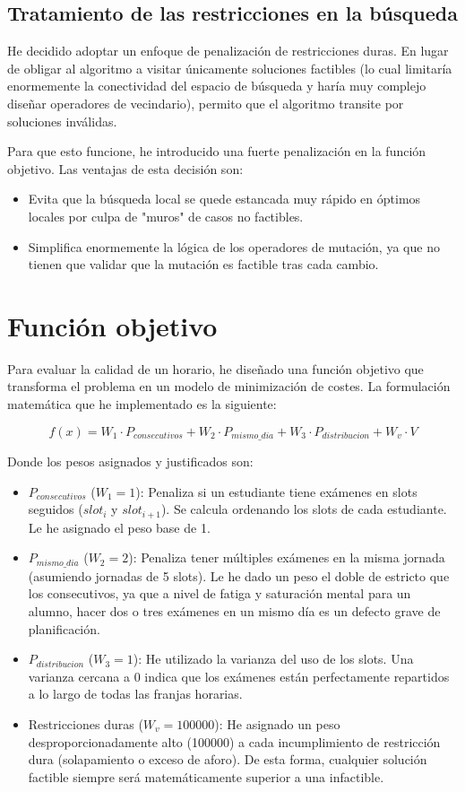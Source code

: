 \documentclass[12pt]{article}
\begin{document}
\subsection{Tratamiento de las restricciones en la búsqueda}
He decidido adoptar un enfoque de penalización de restricciones duras. En lugar de obligar al algoritmo a visitar únicamente soluciones factibles (lo cual limitaría enormemente la conectividad del espacio de búsqueda y haría muy complejo diseñar operadores de vecindario), permito que el algoritmo transite por soluciones inválidas.

Para que esto funcione, he introducido una fuerte penalización en la función objetivo. Las ventajas de esta decisión son:
\begin{itemize}
    \item Evita que la búsqueda local se quede estancada muy rápido en óptimos locales por culpa de "muros" de casos no factibles.
    \item Simplifica enormemente la lógica de los operadores de mutación, ya que no tienen que validar que la mutación es factible tras cada cambio.
\end{itemize}

\section{Función objetivo}
Para evaluar la calidad de un horario, he diseñado una función objetivo que transforma el problema en un modelo de minimización de costes. La formulación matemática que he implementado es la siguiente: 

$$f(x) = W_1 \cdot P_{consecutivos} + W_2 \cdot P_{mismo\_dia} + W_3 \cdot P_{distribucion} + W_v \cdot V$$

Donde los pesos asignados y justificados son:
\begin{itemize}
    \item $P_{consecutivos}$ ($W_1 = 1$): Penaliza si un estudiante tiene exámenes en slots seguidos ($slot_i$ y $slot_{i+1}$). Se calcula ordenando los slots de cada estudiante. Le he asignado el peso base de 1.
    \item $P_{mismo\_dia}$ ($W_2 = 2$): Penaliza tener múltiples exámenes en la misma jornada (asumiendo jornadas de 5 slots). Le he dado un peso el doble de estricto que los consecutivos, ya que a nivel de fatiga y saturación mental para un alumno, hacer dos o tres exámenes en un mismo día es un defecto grave de planificación.
    \item $P_{distribucion}$ ($W_3 = 1$): He utilizado la varianza del uso de los slots. Una varianza cercana a 0 indica que los exámenes están perfectamente repartidos a lo largo de todas las franjas horarias.
    \item Restricciones duras ($W_v = 100000$): He asignado un peso desproporcionadamente alto (100000) a cada incumplimiento de restricción dura (solapamiento o exceso de aforo). De esta forma, cualquier solución factible siempre será matemáticamente superior a una infactible.
\end{itemize}
\end{document}
